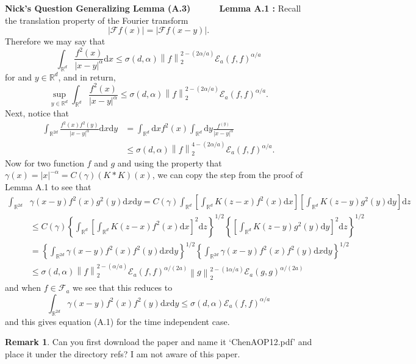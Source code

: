 \documentclass[a4paper,11pt]{article}
\numberwithin{equation}{section}
\theoremstyle{plain}
\theoremstyle{definition}
\newtheorem{remark}[theorem]{Remark}
\newcommand{\ud}{\ensuremath{\mathrm{d} }}
\newcommand{\Norm}[1]{\left\|  #1   \right\|}
\newcommand{\R}{\mathbb{R}}
\newcounter{NQ}
\newenvironment{NickQuestion}[1][] %
{\refstepcounter{NQ}
	\begin{mdframed}[backgroundcolor=lightgray]\textbf{Nick's Question \theNQ \: #1~~}~~~\noindent}%
	{\end{mdframed}}
\numberwithin{NQ}{section}
\numberwithin{LQ}{section}
\numberwithin{ZQ}{section}
\begin{document}
\begin{NickQuestion}[Generalizing Lemma (A.3) \cite{ChenAOP12}]
\noindent \textbf{Lemma A.1 \cite{15AIHP}:}
Recall the translation property of the Fourier transform
	\[
		|\mathcal{F}f(x)|  = |\mathcal{F}f(x-y)|.
	\]
Therefore we may say that
	\[
		\int_{\R^d} \frac{f^2(x)}{|x-y|^\alpha} \ud x \le \sigma(d,\alpha) \Norm{f}_2^{2-(2\alpha/a)}\mathcal{E}_a(f,f)^{\alpha/a}
	\]
for and $y\in \R^d$, and in return,
	\[
		\sup_{y\in \R^d} \int_{\R^d} \frac{f^2(x)}{|x-y|^\alpha} \le \sigma(d,\alpha) \Norm{f}_2^{2-(2\alpha/a)}\mathcal{E}_a(f,f)^{\alpha/a}.
	\]
Next, notice that
	\begin{align*}
		\int_{\R^{2d}} \frac{f^2(x)f^2(y)}{|x-y|^\alpha} \ud x \ud y &= \int_{\R^d} \ud x f^2(x) \int_{\R^d} \ud y \frac{f^(y)}{|x-y|^\alpha}
		\\& \le \sigma(d,\alpha) \Norm{f}_2^{4-(2\alpha/a)}\mathcal{E}_a(f,f)^{\alpha/a}.
	\end{align*}
Now for two function $f$ and $g$ and using the property that $\gamma(x) = |x|^{-\alpha} = C(\gamma) (K*K)(x)$, we can copy the step from the proof of Lemma A.1 \cite{ChenAOP14} to see that
	\begin{align*}
		\int_{\R^{2d}} & \gamma(x-y)f^2(x)g^2(y) \ud x \ud y = C(\gamma) \int_{\R^d}\left[ \int_{\R^d}K(z-x)f^2(x) \ud x \right]\left[ \int_{\R^d}K(z-y)g^2(y) \ud y \right]\ud z
		\\&\le C(\gamma) \left\{\int_{\R^d}\left[ \int_{\R^d}K(z-x)f^2(x) \ud x \right]^2 \ud z \right\}^{1/2}\left\{\left[ \int_{\R^d}K(z-y)g^2(y) \ud y \right]^2\ud z\right\}^{1/2}
		\\&= \left\{ \int_{\R^{2d}} \gamma(x-y)f^2(x)f^2(y) \ud x \ud y \right\}^{1/2} \left\{ \int_{\R^{2d}} \gamma(x-y)f^2(x)f^2(y) \ud x \ud y \right\}^{1/2}
		\\&\le \sigma(d,\alpha) \Norm{f}_2^{2-(\alpha/a)}\mathcal{E}_a(f,f)^{\alpha/(2a)} \Norm{g}_2^{2-(1\alpha/a)}\mathcal{E}_a(g,g)^{\alpha/(2a)}
	\end{align*}
and when $f \in \mathcal{F}_a$ we see that this reduces to
	\begin{equation}\label{E:sobineq1}
			\int_{\R^{2d}} \gamma(x-y)f^2(x)f^2(y) \ud x \ud y \le \sigma(d,\alpha) \mathcal{E}_a(f,f)^{\alpha/a}
	\end{equation}
and this gives equation (A.1) \cite{15AIHP} for the time independent case.
\end{NickQuestion}

\begin{remark}
	Can you first download the paper \cite{ChenAOP12} and name it `ChenAOP12.pdf' and place it under
	the directory refs? I am not aware of this paper.
\end{remark}
\end{document}
